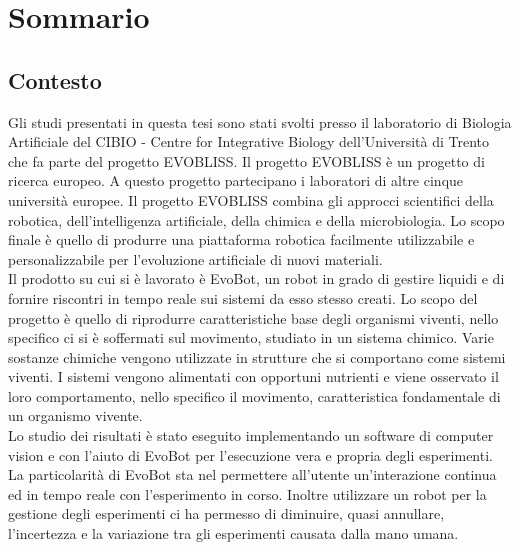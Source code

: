 \chapter*{Sommario} %
\label{sommario}
\section{Contesto}
Gli studi presentati in questa tesi sono stati svolti presso il laboratorio di Biologia Artificiale del CIBIO - Centre for Integrative Biology dell'Università di Trento che fa parte del progetto EVOBLISS. Il progetto EVOBLISS  è un progetto di ricerca europeo. A questo progetto partecipano i laboratori di altre cinque università europee. Il progetto EVOBLISS combina gli approcci scientifici della robotica, dell'intelligenza artificiale, della chimica e della microbiologia. Lo scopo finale è quello di produrre una piattaforma robotica facilmente utilizzabile e personalizzabile per l'evoluzione artificiale di nuovi materiali. 
\\Il prodotto su cui si è lavorato è EvoBot, un robot in grado di gestire liquidi e di fornire riscontri in tempo reale sui sistemi da esso stesso creati. Lo scopo del progetto è quello di riprodurre caratteristiche base degli organismi viventi, nello specifico ci si è soffermati sul movimento, studiato in un sistema chimico. Varie sostanze chimiche vengono utilizzate in strutture che si comportano come sistemi viventi. I sistemi vengono alimentati con opportuni nutrienti e viene osservato il loro comportamento, nello specifico il movimento, caratteristica fondamentale di un organismo vivente. 
\\Lo studio dei risultati è stato eseguito implementando un software di computer vision e con l'aiuto di EvoBot per l'esecuzione vera e propria degli esperimenti. La particolarità di EvoBot sta nel permettere all'utente un'interazione continua ed in tempo reale con l'esperimento in corso.\cite{introd-robot} Inoltre utilizzare un robot per la gestione degli esperimenti ci ha permesso di diminuire, quasi annullare, l'incertezza e la variazione tra gli esperimenti causata dalla mano umana. 
